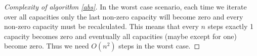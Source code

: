 \begin{proof}[Complexity of algorithm \ref{abs}]
   In the worst case scenario, each time we iterate over all capacities only the last non-zero capacity will become zero
   and every non-zero capacity must be recalculated. This means that every $n$ steps exactly 1 capacity becomes zero
   and eventually all capacities (maybe except for one) become zero. Thus we need $O(n^2)$ steps in the worst case.
\end{proof}
